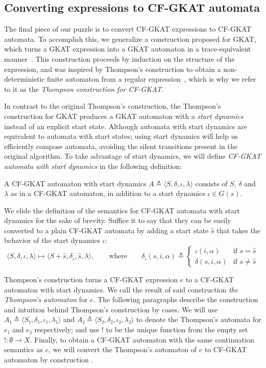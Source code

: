 \subsection{Converting expressions to CF-GKAT automata}

The final piece of our puzzle is to convert CF-GKAT expressions to CF-GKAT automata.
To accomplish this, we generalize a construction proposed for GKAT, which turns a GKAT expression into a GKAT automaton in a trace-equivalent manner~\cite{Smolka_Foster_Hsu_Kappé_Kozen_Silva_2020}.
This construction proceeds by induction on the structure of the expression, and was inspired by Thompson's construction to obtain a non-deterministic finite automaton from a regular expression~\cite{thompson_ProgrammingTechniquesRegular_1968}, which is why we refer to it as the \emph{Thompson construction for CF-GKAT}.

In contrast to the original Thompson's construction, the Thompson's construction for GKAT produces a GKAT automaton with a \emph{start dynamics} instead of an explicit start state. 
Although automata with start dynamics are equivalent to automata with start states; using start dynamics will help us efficiently compose automata, avoiding the silent transitions present in the original algorithm.
To take advantage of start dynamics, we will define \emph{CF-GKAT automata with start dynamics} in the following definition:

\begin{definition}
 A CF-GKAT automaton with start dynamics \(A ≜ ⟨S, δ, ι, λ⟩\) consists of $S$, $δ$ and $λ$ as in a CF-GKAT automaton, in addition to a start dynamics \(ι ∈ G(s)\).
\end{definition}

We elide the definition of the semantics for CF-GKAT automata with start dynamics for the sake of brevity.
Suffice it to say that they can be easily converted to a plain CF-GKAT automata by adding a start state \(\hat{s}\) that takes the behavior of the start dynamics \(ι\):
\begin{equation}\label{cons: CF-GKAT pseudo start to CF-GKAT automata}
 ⟨S, δ, ι, λ⟩ ↦ ⟨S + \hat{s}, δ_ι, \hat{s}, λ⟩,
 \qquad
 \text{where}
 \qquad
 δ_ι(s, i, α) ≜
 \begin{cases}
  ι(i, α)    & \text{if } s = \hat{s} \\
  δ(s, i, α) & \text{if } s ≠ \hat{s}
 \end{cases}
\end{equation}

Thompson's construction turns a CF-GKAT expression \(e\) to a CF-GKAT automaton with start dynamics.
We call the result of said construction \emph{the Thompson's automaton} for \(e\).
The following paragraphs describe the construction and intuition behind Thompson's construction by cases. 
We will use \(A₁ ≜ ⟨S₁, δ₁, ι₁, λ₁⟩\) and \(A₂ ≜ ⟨S₂, δ₂, ι₂, λ₂⟩\) to denote the Thompson's automata for \(e₁\) and \(e₂\) respectively; and use \({!}\) to be the unique function from the empty set \({!}: ∅ → X\).
Finally, to obtain a CF-GKAT automaton with the same continuation semantics as \(e\), we will convert the Thompson's automaton of \(e\) to CF-GKAT automaton by construction .


